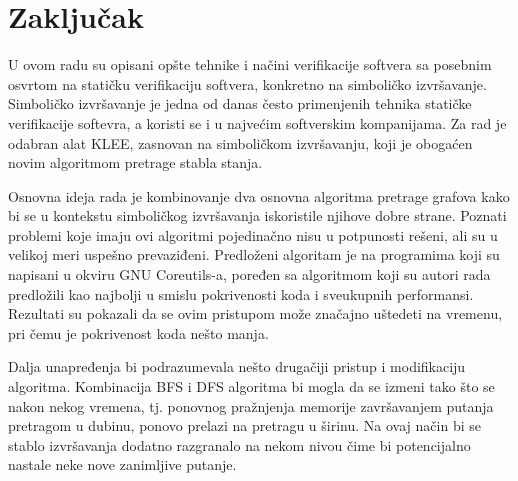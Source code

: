 \documentclass[12pt,oneside]{memoir}
\begin{document}
\chapter{Zaključak}
U ovom radu su opisani opšte tehnike i načini verifikacije softvera sa posebnim osvrtom na statičku verifikaciju softvera, konkretno na simboličko izvršavanje. Simboličko izvršavanje je jedna od danas često 
primenjenih tehnika statičke verifikacije softevra, a koristi se i u najvećim softverskim kompanijama. Za rad je odabran alat KLEE, zasnovan na simboličkom izvršavanju, koji je obogaćen novim algoritmom pretrage stabla stanja.

Osnovna ideja rada je kombinovanje dva osnovna algoritma pretrage grafova kako bi se u kontekstu simboličkog izvršavanja iskoristile njihove dobre strane. Poznati problemi koje imaju ovi algoritmi pojedinačno nisu u potpunosti rešeni, ali su u velikoj meri uspešno prevaziđeni. Predloženi algoritam je na programima koji su napisani u okviru GNU Coreutils-a, poređen sa algoritmom koji su autori rada predložili kao najbolji u smislu pokrivenosti koda i sveukupnih performansi. Rezultati su pokazali da se ovim pristupom može značajno uštedeti na vremenu, pri čemu je pokrivenost koda nešto manja.

Dalja unapređenja bi podrazumevala nešto drugačiji pristup i modifikaciju algoritma. Kombinacija BFS i DFS algoritma bi mogla da se izmeni tako što se nakon nekog vremena, tj. ponovnog pražnjenja memorije završavanjem putanja pretragom u dubinu, ponovo prelazi na pretragu u širinu. Na ovaj način bi se stablo izvršavanja dodatno razgranalo na nekom nivou čime bi potencijalno nastale neke nove zanimljive putanje.
\printbibliography[heading=bibintoc,title=\foreignlanguage{serbian}{Literatura}]

\backmatter
\end{document}
